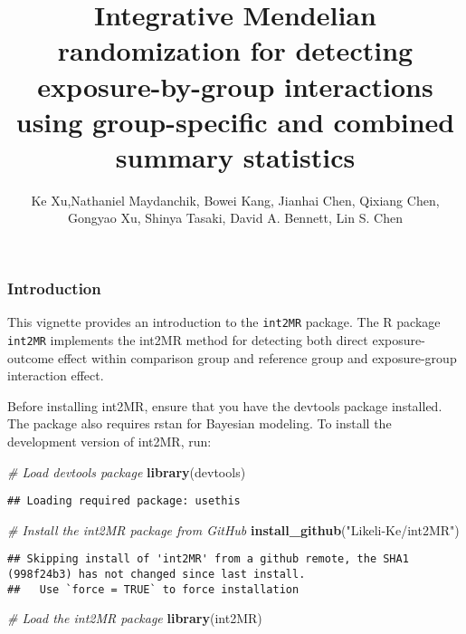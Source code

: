 \documentclass[
]{article}
\title{Integrative Mendelian randomization for detecting
exposure-by-group interactions using group-specific and combined summary
statistics}
\author{Ke Xu,Nathaniel Maydanchik, Bowei Kang, Jianhai Chen, Qixiang
Chen, Gongyao Xu, Shinya Tasaki, David A. Bennett, Lin S. Chen}
\date{}
\newenvironment{Shaded}{\begin{snugshade}}{\end{snugshade}}
\newcommand{\CommentTok}[1]{\textcolor[rgb]{0.56,0.35,0.01}{\textit{#1}}}
\newcommand{\FunctionTok}[1]{\textcolor[rgb]{0.13,0.29,0.53}{\textbf{#1}}}
\newcommand{\NormalTok}[1]{#1}
\newcommand{\StringTok}[1]{\textcolor[rgb]{0.31,0.60,0.02}{#1}}
\begin{document}
\maketitle

\subsubsection{Introduction}\label{introduction}

This vignette provides an introduction to the \texttt{int2MR} package.
The R package \texttt{int2MR} implements the int2MR method for detecting
both direct exposure-outcome effect within comparison group and
reference group and exposure-group interaction effect.

Before installing int2MR, ensure that you have the devtools package
installed. The package also requires rstan for Bayesian modeling. To
install the development version of int2MR, run:

\begin{Shaded}
\begin{Highlighting}[]
\CommentTok{\# Load devtools package}
\FunctionTok{library}\NormalTok{(devtools)}
\end{Highlighting}
\end{Shaded}

\begin{verbatim}
## Loading required package: usethis
\end{verbatim}

\begin{Shaded}
\begin{Highlighting}[]
\CommentTok{\# Install the int2MR package from GitHub}
\FunctionTok{install\_github}\NormalTok{(}\StringTok{"Likeli{-}Ke/int2MR"}\NormalTok{)}
\end{Highlighting}
\end{Shaded}

\begin{verbatim}
## Skipping install of 'int2MR' from a github remote, the SHA1 (998f24b3) has not changed since last install.
##   Use `force = TRUE` to force installation
\end{verbatim}

\begin{Shaded}
\begin{Highlighting}[]
\CommentTok{\# Load the int2MR package}
\FunctionTok{library}\NormalTok{(int2MR)}
\end{Highlighting}
\end{Shaded}
\end{document}
